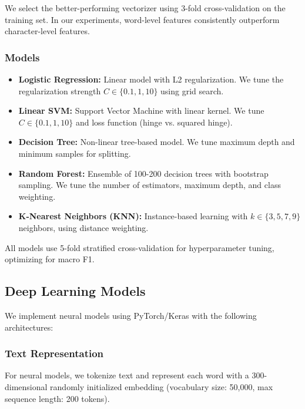 \documentclass[conference]{IEEEtran}
\begin{document}
We select the better-performing vectorizer using 3-fold cross-validation on the training set. In our experiments, word-level features consistently outperform character-level features.

\subsubsection{Models}
\begin{itemize}
\item \textbf{Logistic Regression:} Linear model with L2 regularization. We tune the regularization strength $C \in \{0.1, 1, 10\}$ using grid search.
\item \textbf{Linear SVM:} Support Vector Machine with linear kernel. We tune $C \in \{0.1, 1, 10\}$ and loss function (hinge vs. squared hinge).
\item \textbf{Decision Tree:} Non-linear tree-based model. We tune maximum depth and minimum samples for splitting.
\item \textbf{Random Forest:} Ensemble of 100-200 decision trees with bootstrap sampling. We tune the number of estimators, maximum depth, and class weighting.
\item \textbf{K-Nearest Neighbors (KNN):} Instance-based learning with $k \in \{3, 5, 7, 9\}$ neighbors, using distance weighting.
\end{itemize}

All models use 5-fold stratified cross-validation for hyperparameter tuning, optimizing for macro F1.

\subsection{Deep Learning Models}

We implement neural models using PyTorch/Keras with the following architectures:

\subsubsection{Text Representation}
For neural models, we tokenize text and represent each word with a 300-dimensional randomly initialized embedding (vocabulary size: 50,000, max sequence length: 200 tokens).
\end{document}
